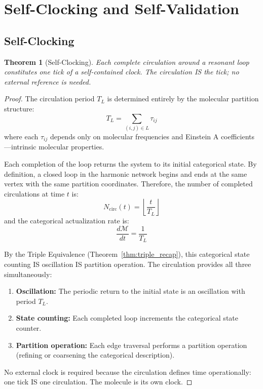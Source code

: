 \documentclass[11pt,twocolumn,a4paper]{article}
\newtheorem{theorem}{Theorem}[section]
\theoremstyle{definition}
\theoremstyle{remark}
\newcommand{\Depth}{\mathcal{M}}
\begin{document}
\section{Self-Clocking and Self-Validation}
\label{sec:self_clocking}

\subsection{Self-Clocking}

\begin{theorem}[Self-Clocking]
\label{thm:self_clocking}
Each complete circulation around a resonant loop constitutes one tick of a self-contained clock. The circulation IS the tick; no external reference is needed.
\end{theorem}

\begin{proof}
The circulation period $T_L$ is determined entirely by the molecular partition structure:
\begin{equation}
T_L = \sum_{(i,j) \in L} \tau_{ij}
\end{equation}
where each $\tau_{ij}$ depends only on molecular frequencies and Einstein A coefficients---intrinsic molecular properties.

Each completion of the loop returns the system to its initial categorical state. By definition, a closed loop in the harmonic network begins and ends at the same vertex with the same partition coordinates. Therefore, the number of completed circulations at time $t$ is:
\begin{equation}
N_{\mathrm{circ}}(t) = \left\lfloor \frac{t}{T_L} \right\rfloor
\end{equation}
and the categorical actualization rate is:
\begin{equation}
\frac{d\Depth}{dt} = \frac{1}{T_L}
\end{equation}

By the Triple Equivalence (Theorem~\ref{thm:triple_recap}), this categorical state counting IS oscillation IS partition operation. The circulation provides all three simultaneously:
\begin{enumerate}[nosep]
\item \textbf{Oscillation:} The periodic return to the initial state is an oscillation with period $T_L$.
\item \textbf{State counting:} Each completed loop increments the categorical state counter.
\item \textbf{Partition operation:} Each edge traversal performs a partition operation (refining or coarsening the categorical description).
\end{enumerate}

No external clock is required because the circulation defines time operationally: one tick IS one circulation. The molecule is its own clock.
\end{proof}
\end{document}

